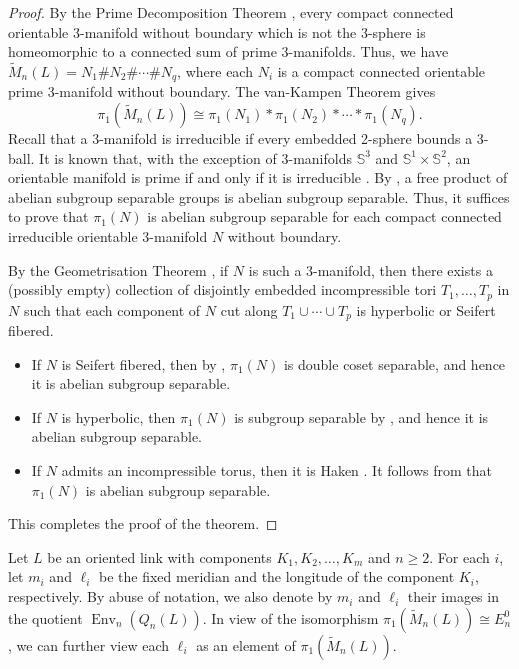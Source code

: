 \documentclass[12pt]{amsart}
\theoremstyle{definition}
\numberwithin{equation}{subsection}
\newcommand{\Env}{\operatorname{Env}}
\begin{document}
\begin{proof}
By the Prime Decomposition Theorem \cite[Theorem 1]{MR0142125}, every compact connected orientable 3-manifold without boundary which is not the 3-sphere is homeomorphic to a connected sum of prime 3-manifolds. Thus, we have
$\widetilde{M}_{n}(L)= N_1 \# N_2 \# \cdots \# N_q$, where each $N_i$ is a compact connected orientable prime 3-manifold without boundary. The van-Kampen Theorem gives $$\pi_{1}(\widetilde{M}_{n}(L)) \cong \pi_1(N_1) * \pi_1(N_2) * \cdots * \pi_1(N_q).$$ Recall that a 3-manifold is irreducible if every embedded 2-sphere bounds a 3-ball. It is known that, with the exception of 3-manifolds $\mathbb{S}^{3}$ and $\mathbb{S}^{1} \times \mathbb{S}^{2}$, an orientable manifold is prime if and only if it is irreducible \cite[Lemma 1]{MR0142125}. By \cite[Proposition 6]{MR1851085}, a free product of abelian subgroup separable groups is abelian subgroup separable. Thus, it suffices to prove that  $\pi_1(N)$ is abelian subgroup separable for each compact connected irreducible orientable 3-manifold $N$ without boundary. 
\par

By the Geometrisation Theorem \cite[Theorem 1.7.6]{MR3444187}, if $N$ is such a  3-manifold, then there exists a (possibly empty)
collection of disjointly embedded incompressible tori $T_1,\ldots,T_p$ in $N$ such that each component of $N$ cut along $T_1\cup \cdots \cup T_p$ is hyperbolic or Seifert fibered. 
\begin{itemize}
\item If $N$ is Seifert fibered, then by \cite[Corollary 5.1]{MR1154898}, $\pi_1(N)$ is double coset separable, and hence it is abelian subgroup separable.
\item If $N$ is hyperbolic, then $\pi_1(N)$ is subgroup separable by \cite[Corollary 4.2.3]{MR3444187}, and hence it is abelian subgroup separable.
\item If $N$ admits an incompressible torus, then it is Haken \cite[p.45, A.10]{MR3444187}. It follows from \cite[Theorem 1]{MR1851085} that $\pi_1(N)$ is abelian subgroup separable.
\end{itemize}
This completes the proof of the theorem.
\end{proof}

Let $L$ be an oriented link with components $K_1, K_2, \ldots, K_m$ and $n \ge 2$. For each $i$, let $m_i$ and $\ell_i$ be the fixed meridian and the longitude of the component $K_i$, respectively. By abuse of notation, we also denote by $m_i$ and $\ell_i$ their images in the quotient $\Env_n(Q_{n}(L))$.  In view of the isomorphism $\pi_{1}\left( \widetilde{M}_{n}(L)\right) \cong E_n^0$, we can further view each $\ell_i$ as an element of $\pi_{1}\left( \widetilde{M}_{n}(L)\right)$.
\end{document}
